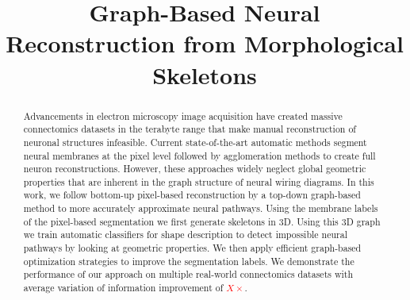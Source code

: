 \documentclass[10pt,twocolumn,letterpaper]{article}
\newcommand{\FIX}[1]{\textcolor{red}{#1}}
\begin{document}
\title{Graph-Based Neural Reconstruction from Morphological Skeletons}



\maketitle
%

\begin{abstract}
Advancements in electron microscopy image acquisition have created massive connectomics datasets in the terabyte range that make manual reconstruction of neuronal structures infeasible. 
Current state-of-the-art automatic methods segment neural membranes at the pixel level followed by agglomeration methods to create full neuron reconstructions. 
However, these approaches widely neglect global geometric properties that are inherent in the graph structure of neural wiring diagrams.
In this work, we follow bottom-up pixel-based reconstruction by a top-down graph-based method to more accurately approximate neural pathways. 
Using the membrane labels of the pixel-based segmentation we first generate skeletons in 3D.
Using this 3D graph we train automatic classifiers for shape description to detect impossible neural pathways by looking at geometric properties.
We then apply efficient graph-based optimization strategies to improve the segmentation labels. We demonstrate the performance of our approach on multiple real-world connectomics datasets with average variation of information improvement of \FIX{$X\times$}. 
\end{abstract}














{\small

}
\end{document}

